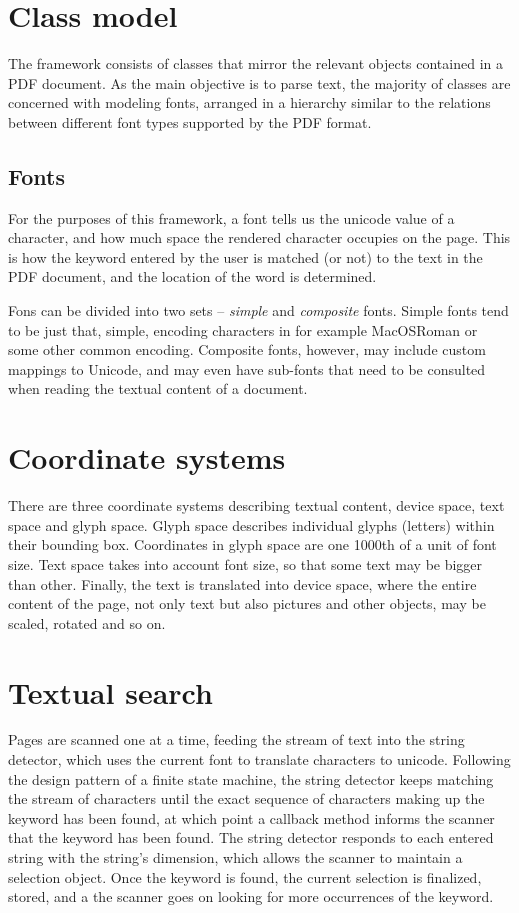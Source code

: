 \documentclass[12pt,a4paper]{article}
\begin{document}
\section{Class model}

The framework consists of classes that mirror the relevant objects contained in a PDF document. As the main objective is to parse text, the majority of classes are concerned with modeling fonts, arranged in a hierarchy similar to the relations between different font types supported by the PDF format. 

\subsection{Fonts}

For the purposes of this framework, a font tells us the unicode value of a character, and how much space the rendered character occupies on the page. This is how the keyword entered by the user is matched (or not) to the text in the PDF document, and the location of the word is determined.

Fons can be divided into two sets -- \textit{simple} and \textit{composite} fonts. Simple fonts tend to be just that, simple, encoding characters in for example MacOSRoman or some other common encoding. Composite fonts, however, may include custom mappings to Unicode, and may even have sub-fonts that need to be consulted when reading the textual content of a document.

\section{Coordinate systems}

There are three coordinate systems describing textual content, device space, text space and glyph space. Glyph space describes individual glyphs (letters) within their bounding box. Coordinates in glyph space are one 1000th of a unit of font size. Text space takes into account font size, so that some text may be bigger than other. Finally, the text is translated into device space, where the entire content of the page, not only text but also pictures and other objects, may be scaled, rotated and so on.

\section{Textual search}

Pages are scanned one at a time, feeding the stream of text into the string detector, which uses the current font to translate characters to unicode. Following the design pattern of a finite state machine, the string detector keeps matching the stream of characters until the exact sequence of characters making up the keyword has been found, at which point a callback method informs the scanner that the keyword has been found. The string detector responds to each entered string with the string's dimension, which allows the scanner to maintain a selection object. Once the keyword is found, the current selection is finalized, stored, and a the scanner goes on looking for more occurrences of the keyword.
\end{document}
